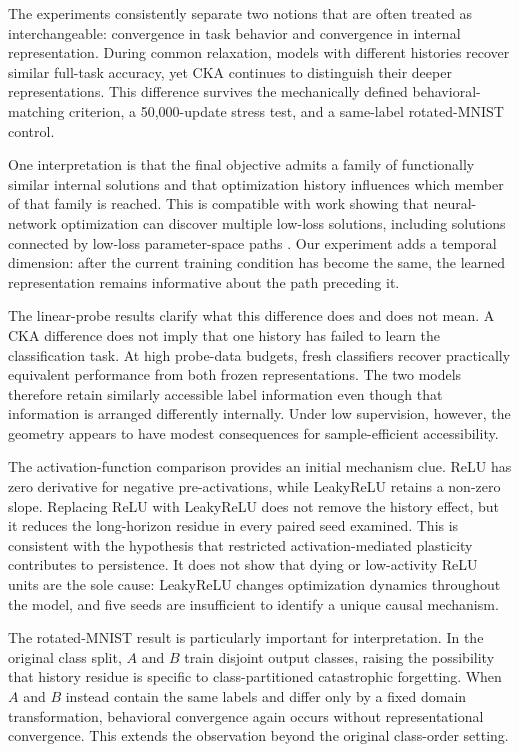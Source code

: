 \documentclass[11pt,a4paper]{article}
\begin{document}
The experiments consistently separate two notions that are often treated as interchangeable: convergence in task behavior and convergence in internal representation. During common relaxation, models with different histories recover similar full-task accuracy, yet CKA continues to distinguish their deeper representations. This difference survives the mechanically defined behavioral-matching criterion, a 50,000-update stress test, and a same-label rotated-MNIST control.

One interpretation is that the final objective admits a family of functionally similar internal solutions and that optimization history influences which member of that family is reached. This is compatible with work showing that neural-network optimization can discover multiple low-loss solutions, including solutions connected by low-loss parameter-space paths \citep{draxler2018barriers,garipov2018loss}. Our experiment adds a temporal dimension: after the current training condition has become the same, the learned representation remains informative about the path preceding it.

The linear-probe results clarify what this difference does and does not mean. A CKA difference does not imply that one history has failed to learn the classification task. At high probe-data budgets, fresh classifiers recover practically equivalent performance from both frozen representations. The two models therefore retain similarly accessible label information even though that information is arranged differently internally. Under low supervision, however, the geometry appears to have modest consequences for sample-efficient accessibility.

The activation-function comparison provides an initial mechanism clue. ReLU has zero derivative for negative pre-activations, while LeakyReLU retains a non-zero slope. Replacing ReLU with LeakyReLU does not remove the history effect, but it reduces the long-horizon residue in every paired seed examined. This is consistent with the hypothesis that restricted activation-mediated plasticity contributes to persistence. It does not show that dying or low-activity ReLU units are the sole cause: LeakyReLU changes optimization dynamics throughout the model, and five seeds are insufficient to identify a unique causal mechanism.

The rotated-MNIST result is particularly important for interpretation. In the original class split, $A$ and $B$ train disjoint output classes, raising the possibility that history residue is specific to class-partitioned catastrophic forgetting. When $A$ and $B$ instead contain the same labels and differ only by a fixed domain transformation, behavioral convergence again occurs without representational convergence. This extends the observation beyond the original class-order setting.
\end{document}
